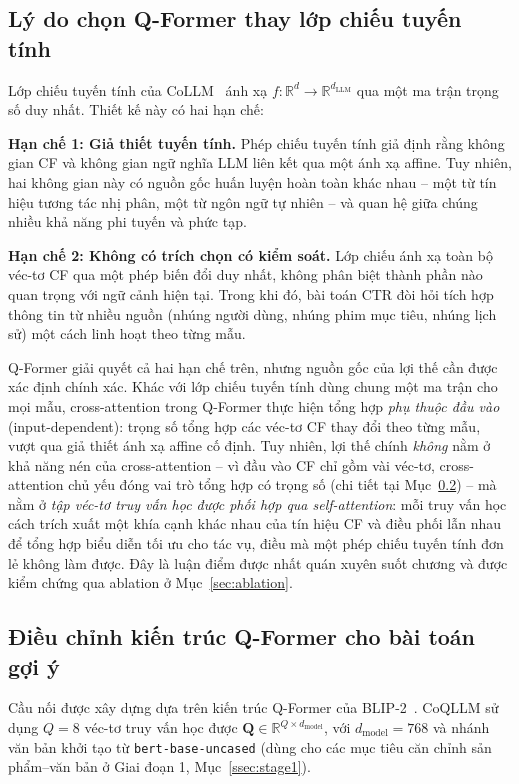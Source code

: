 \subsection{Lý do chọn Q-Former thay lớp chiếu tuyến tính}
\label{ssec:ly-do-qformer}

Lớp chiếu tuyến tính của CoLLM~\cite{collm2023} ánh xạ $f: \mathbb{R}^d
\rightarrow \mathbb{R}^{d_{\text{LLM}}}$ qua một ma trận trọng số duy nhất. Thiết kế
này có hai hạn chế:

\textbf{Hạn chế 1: Giả thiết tuyến tính.} Phép chiếu tuyến tính giả định rằng không gian
CF và không gian ngữ nghĩa LLM liên kết qua một ánh xạ affine. Tuy nhiên, hai không gian
này có nguồn gốc huấn luyện hoàn toàn khác nhau -- một từ tín hiệu tương tác nhị phân,
một từ ngôn ngữ tự nhiên -- và quan hệ giữa chúng nhiều khả năng phi tuyến và phức tạp.

\textbf{Hạn chế 2: Không có trích chọn có kiểm soát.} Lớp chiếu ánh xạ toàn bộ véc-tơ
CF qua một phép biến đổi duy nhất, không phân biệt thành phần nào quan trọng với ngữ
cảnh hiện tại. Trong khi đó, bài toán CTR đòi hỏi tích hợp thông tin từ nhiều nguồn
(nhúng người dùng, nhúng phim mục tiêu, nhúng lịch sử) một cách linh hoạt theo từng mẫu.

Q-Former giải quyết cả hai hạn chế trên, nhưng nguồn gốc của lợi thế cần được xác định
chính xác. Khác với lớp chiếu tuyến tính dùng chung một ma trận cho mọi mẫu,
cross-attention trong Q-Former thực hiện tổng hợp \textit{phụ thuộc đầu vào}
(input-dependent): trọng số tổng hợp các véc-tơ CF thay đổi theo từng mẫu, vượt qua giả
thiết ánh xạ affine cố định. Tuy nhiên, lợi thế chính \textit{không} nằm ở khả năng nén
của cross-attention -- vì đầu vào CF chỉ gồm vài véc-tơ, cross-attention chủ yếu đóng vai
trò tổng hợp có trọng số (chi tiết tại Mục~\ref{ssec:qformer-kien-truc}) -- mà nằm ở
\textit{tập véc-tơ truy vấn học được phối hợp qua self-attention}: mỗi truy vấn học cách
trích xuất một khía cạnh khác nhau của tín hiệu CF và điều phối lẫn nhau để tổng hợp biểu
diễn tối ưu cho tác vụ, điều mà một phép chiếu tuyến tính đơn lẻ không làm được. Đây là
luận điểm được nhất quán xuyên suốt chương và được kiểm chứng qua ablation ở
Mục~\ref{sec:ablation}.

\subsection{Điều chỉnh kiến trúc Q-Former cho bài toán gợi ý}
\label{ssec:qformer-kien-truc}

Cầu nối được xây dựng dựa trên kiến trúc Q-Former của BLIP-2~\cite{blip2_2023}. CoQLLM
sử dụng $Q = 8$ véc-tơ truy vấn học được $\mathbf{Q} \in \mathbb{R}^{Q \times
d_{\text{model}}}$, với $d_{\text{model}} = 768$ và nhánh văn bản khởi tạo từ
\texttt{bert-base-uncased} (dùng cho các mục tiêu căn chỉnh sản phẩm--văn bản ở
Giai đoạn 1, Mục~\ref{ssec:stage1}).

